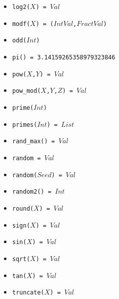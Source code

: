 \documentclass[10pt]{article}
\begin{document}
\begin{multicols}{2}
\begin{scriptsize}
\begin{itemize}
   \item \texttt{log2($X$) = $Val$} 
   \item \texttt{modf($X$) = ($IntVal$,$FractVal$)} 
   \item \texttt{odd($Int$)} 
   \item \texttt{pi() = 3.14159265358979323846} 
   \item \texttt{pow($X$,$Y$) = $Val$}
   \item \texttt{pow\_mod($X$,$Y$,$Z$) = $Val$}
   \item \texttt{prime($Int$)} 
   \item \texttt{primes($Int$) = $List$} 
   \item \texttt{rand\_max() = $Val$} 
   \item \texttt{random = $Val$} 
   \item \texttt{random($Seed$) = $Val$} 
   \item \texttt{random2() = $Int$} 
   \item \texttt{round($X$) = $Val$}
   \item \texttt{sign($X$) = $Val$}  
   \item \texttt{sin($X$) = $Val$} 
   \item \texttt{sqrt($X$) = $Val$} 
   \item \texttt{tan($X$) = $Val$}
   \item \texttt{truncate($X$) = $Val$}  

\end{itemize}
\end{scriptsize}
\end{multicols}
\end{document}

